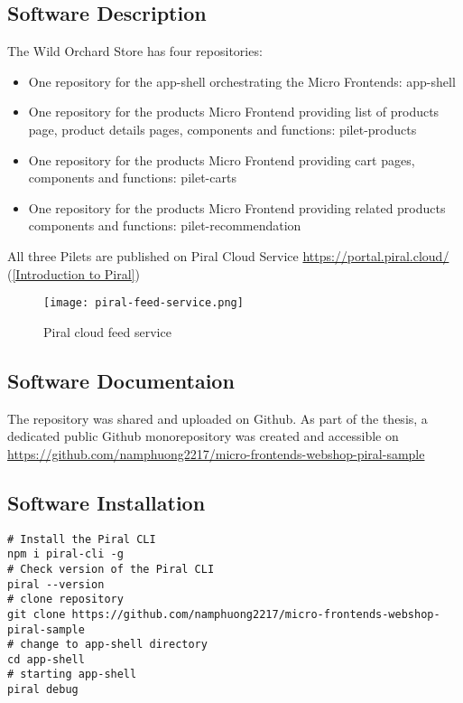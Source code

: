 \documentclass[a4paper]{book}
\begin{document}
\subsection{Software Description}
The Wild Orchard Store has four repositories:
\begin{itemize}
    \item One repository for the app-shell orchestrating the Micro Frontends: app-shell
    \item One repository for the products Micro Frontend providing list of products page, product details pages, components and functions: pilet-products
    \item One repository for the products Micro Frontend providing cart pages, components and functions: pilet-carts
    \item One repository for the products Micro Frontend providing related products components and functions: pilet-recommendation
\end{itemize}
			
All three Pilets are published on Piral Cloud Service \url{https://portal.piral.cloud/ } (\ref{Introduction to Piral})
\begin{figure}[h!]
  \centering
  \captionsetup{justification=centering}
  \texttt{[image: piral-feed-service.png]}
   \caption{Piral cloud feed service}
  \label{fig:9}
\end{figure}
\subsection{Software Documentaion}
The repository was shared and uploaded on Github. As part of the thesis, a dedicated public Github monorepository was created and accessible on \url{https://github.com/namphuong2217/micro-frontends-webshop-piral-sample}

\subsection{Software Installation} \label{Software Installation}

\begin{lstlisting}[caption={Installation step by step (\url{https://docs.piral.io/guidelines/tutorials/02-getting-started})}]
# Install the Piral CLI
npm i piral-cli -g
# Check version of the Piral CLI
piral --version
# clone repository
git clone https://github.com/namphuong2217/micro-frontends-webshop-piral-sample
# change to app-shell directory
cd app-shell
# starting app-shell
piral debug 
\end{lstlisting}
\end{document}
